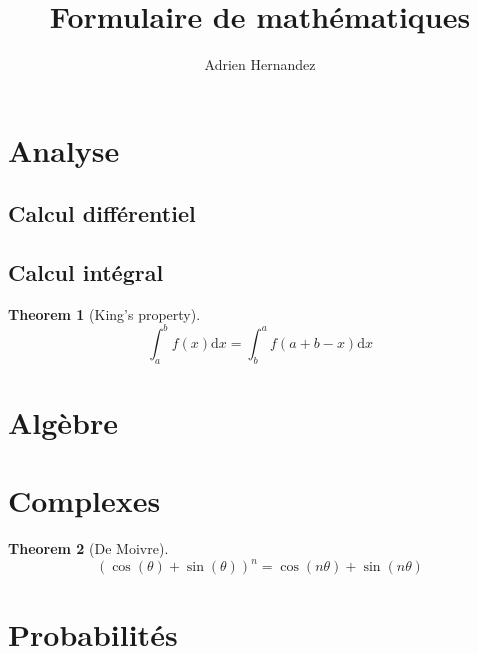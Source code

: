 \documentclass{article}
\title{Formulaire de mathématiques}
\author{Adrien Hernandez}
\date{}
\newtheorem{theorem}{Theorem}
\begin{document}
\maketitle
\section{Analyse}
\subsection{Calcul différentiel}

\subsection{Calcul intégral}
\begin{theorem}[King's property]

    $$ \int_a^b f(x) \mathrm{d}x = \int_b^a f(a+b-x) \mathrm{d}x $$
    
\end{theorem}

\section{Algèbre}

\section{Complexes}
\begin{theorem}[De Moivre]
    $$(\cos(\theta) + \sin(\theta))^n =  \cos(n\theta) + \sin(n\theta)$$
\end{theorem}

\section{Probabilités}
\end{document}
